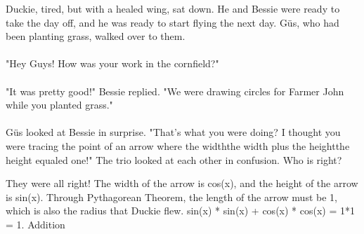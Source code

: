  {Duckie, tired, but with a healed wing, sat down. He and Bessie were ready to take the day off, and he was ready to start flying the next day. Güs, who had been planting grass, walked over to them. 
 \paragraph{} "Hey Guys! How was your work in the cornfield?"
 \paragraph{} "It was pretty good!" Bessie replied. "We were drawing circles for Farmer John while you planted grass."
 \paragraph{} Güs looked at Bessie in surprise. "That's what you were doing? I thought you were tracing the point of an arrow where the width\texttimes the width plus the height\texttimes the height equaled one!"
 The trio looked at each other in confusion. Who is right?}
 {They were all right! The width of the arrow is cos(x), and the height of the arrow is sin(x). Through Pythagorean Theorem, the length of the arrow must be 1, which is also the radius that Duckie flew.}
 {sin(x) * sin(x) + cos(x) * cos(x) = 1*1 = 1.}
 {Addition}